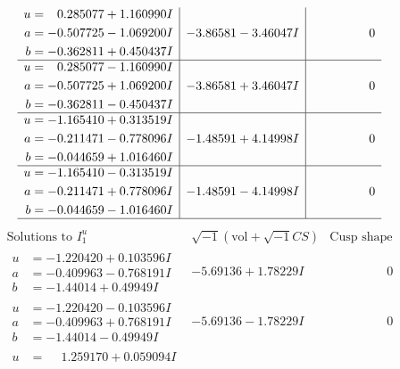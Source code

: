 \documentclass[1p]{elsarticle_modified}
\theoremstyle{definition}
\newcommand{\I}{\sqrt{-1}}
\begin{document}
$$\begin{array}{c|c|c}
\begin{aligned}
u &= \phantom{-}0.285077 + 1.160990 I \\
a &= -0.507725 - 1.069200 I \\
b &= -0.362811 + 0.450437 I\end{aligned}
 & -3.86581 - 3.46047 I & \phantom{-0.000000 } 0 \\ \hline\begin{aligned}
u &= \phantom{-}0.285077 - 1.160990 I \\
a &= -0.507725 + 1.069200 I \\
b &= -0.362811 - 0.450437 I\end{aligned}
 & -3.86581 + 3.46047 I & \phantom{-0.000000 } 0 \\ \hline\begin{aligned}
u &= -1.165410 + 0.313519 I \\
a &= -0.211471 - 0.778096 I \\
b &= -0.044659 + 1.016460 I\end{aligned}
 & -1.48591 + 4.14998 I & \phantom{-0.000000 } 0 \\ \hline\begin{aligned}
u &= -1.165410 - 0.313519 I \\
a &= -0.211471 + 0.778096 I \\
b &= -0.044659 - 1.016460 I\end{aligned}
 & -1.48591 - 4.14998 I & \phantom{-0.000000 } 0\\
 \hline 
 \end{array}$$\newpage$$\begin{array}{c|c|c}  
\text{Solutions to }I^u_{1}& \I (\text{vol} + \sqrt{-1}CS) & \text{Cusp shape}\\
 \hline 
\begin{aligned}
u &= -1.220420 + 0.103596 I \\
a &= -0.409963 - 0.768191 I \\
b &= -1.44014 + 0.49949 I\end{aligned}
 & -5.69136 + 1.78229 I & \phantom{-0.000000 } 0 \\ \hline\begin{aligned}
u &= -1.220420 - 0.103596 I \\
a &= -0.409963 + 0.768191 I \\
b &= -1.44014 - 0.49949 I\end{aligned}
 & -5.69136 - 1.78229 I & \phantom{-0.000000 } 0 \\ \hline\begin{aligned}
u &= \phantom{-}1.259170 + 0.059094 I \\

\end{aligned}
\end{array}$$
\end{document}

